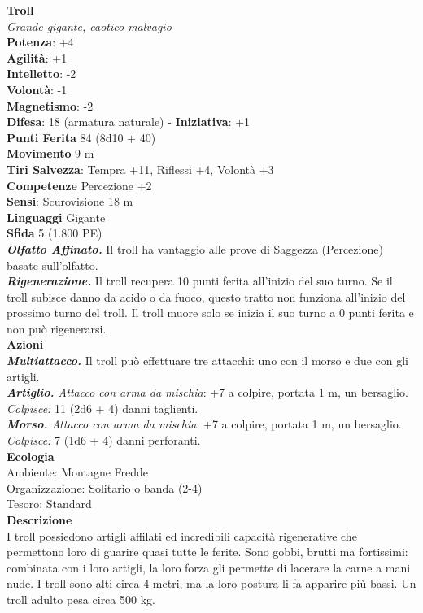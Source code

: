 \begin{multicols}{2}
\medskip\textbf{Troll}\\
\emph{Grande gigante, caotico malvagio}\\
\textbf{Potenza}: +4\\
\textbf{Agilità}: +1\\
\textbf{Intelletto}: -2\\
\textbf{Volontà}: -1\\
\textbf{Magnetismo}: -2\\
\textbf{Difesa}: 18 (armatura naturale) - \textbf{Iniziativa}: +1\\
\textbf{Punti Ferita} 84 (8d10 + 40)\\
\textbf{Movimento} 9 m\\
\textbf{Tiri Salvezza}: Tempra +11, Riflessi +4, Volontà +3\\
\textbf{Competenze} Percezione +2\\
\textbf{Sensi}: Scurovisione 18 m\\
\textbf{Linguaggi} Gigante\\
\textbf{Sfida} 5 (1.800 PE)\smallskip\\
\emph{\textbf{Olfatto Affinato.}} Il troll ha vantaggio alle prove di Saggezza (Percezione) basate sull'olfatto.\\
\emph{\textbf{Rigenerazione.}} Il troll recupera 10 punti ferita all'inizio del suo turno. Se il troll subisce danno da acido o da fuoco, questo tratto non funziona all'inizio del prossimo turno del troll. Il troll muore solo se inizia il suo turno a 0 punti ferita e non può rigenerarsi.\\
\smallskip\textbf{Azioni}\\
\emph{\textbf{Multiattacco.}} Il troll può effettuare tre attacchi: uno con il morso e due con gli artigli.\\
\emph{\textbf{Artiglio.} Attacco con arma da mischia}: +7 a colpire, portata 1 m, un bersaglio.\\
\emph{Colpisce:} 11 (2d6 + 4) danni taglienti.\\
\emph{\textbf{Morso.} Attacco con arma da mischia}: +7 a colpire, portata 1 m, un bersaglio.\\
\emph{Colpisce:} 7 (1d6 + 4) danni perforanti.\\
\textbf{Ecologia}\\
Ambiente: Montagne Fredde\\
Organizzazione: Solitario o banda (2-4)\\
Tesoro: Standard\\
\textbf{Descrizione}\\
I troll possiedono artigli affilati ed incredibili capacità rigenerative che permettono loro di guarire quasi tutte le ferite. Sono gobbi, brutti ma fortissimi: combinata con i loro artigli, la loro forza gli permette di lacerare la carne a mani nude. I troll sono alti circa 4 metri, ma la loro postura li fa apparire più bassi. Un troll adulto pesa circa 500 kg.\\


\end{multicols}
